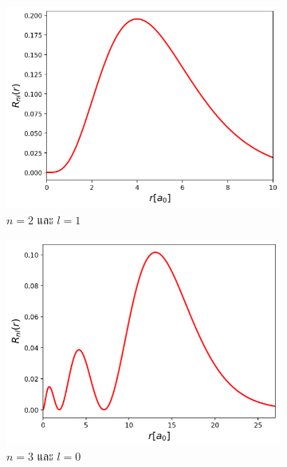 \begin{figure}[H]
\begin{subfigure}{0.5\textwidth}
        \includegraphics[width=0.9\linewidth]{fig/wfn_hydro_radial_n2_l1.png}
        \caption{$n = 2$ และ $l = 1$}
        \label{fig:wfn_hydro_radial_n2_l1}
    \end{subfigure}%
    \begin{subfigure}{0.5\textwidth}
        \centering
        \includegraphics[width=0.9\linewidth]{fig/wfn_hydro_radial_n3_l0.png}
        \caption{$n = 3$ และ $l = 0$}
        \label{fig:wfn_hydro_radial_n3_l0}
    \end{subfigure}
    \\
    \vspace{1em}
    \begin{subfigure}{0.5\textwidth}
        \centering

\end{subfigure}
\end{figure}
